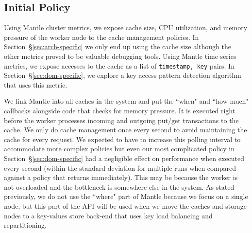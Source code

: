 \subsection{Initial Policy}

Using Mantle cluster metrics, we expose cache size, CPU utilization, and memory
pressure of the worker node to the cache management policies. In
Section~\S\ref{sec:arch-specific} we only end up using the cache size although
the other metrics proved to be valuable debugging tools. Using Mantle time
series metrics, we expose accesses to the cache as a list of \texttt{timestamp,
key} pairs. In Section~\S\ref{sec:dom-specific}, we explore a key access
pattern detection algorithm that uses this metric.

We link Mantle into all caches in the system and put the ``when" and ``how
much" callbacks alongside code that checks for memory pressure. It is executed
right before the worker processes incoming and outgoing put/get transactions to
the cache. We only do cache management once every second to avoid maintaining
the cache for every request. We expected to have to increase this polling
interval to accommodate more complex policies but even our most complicated
policy in Section~\S\ref{sec:dom-specific} had a negligible effect on
performance when executed every second (within the standard deviation for
multiple runs when compared against a policy that returns immediately). This
may be because the worker is not overloaded and the bottleneck is somewhere
else in the system.  As stated previously, we do not use the ``where" part of
Mantle because we focus on a single node, but this part of the API will be used
when we move the caches and storage nodes to a key-values store back-end that
uses key load balancing and repartitioning.

